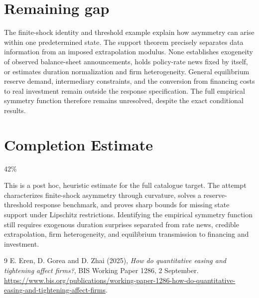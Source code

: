 \documentclass[11pt]{article}
\theoremstyle{definition}
\begin{document}
\section*{Remaining gap}
The finite-shock identity and threshold example explain how asymmetry can arise within one predetermined state. The support theorem precisely separates data information from an imposed extrapolation modulus. None establishes exogeneity of observed balance-sheet announcements, holds policy-rate news fixed by itself, or estimates duration normalization and firm heterogeneity. General equilibrium reserve demand, intermediary constraints, and the conversion from financing costs to real investment remain outside the response specification. The full empirical symmetry function therefore remains unresolved, despite the exact conditional results.

\section{Completion Estimate}
42\%

This is a post hoc, heuristic estimate for the full catalogue target.
The attempt characterizes finite-shock asymmetry through curvature, solves a reserve-threshold response benchmark, and proves sharp bounds for missing state support under Lipschitz restrictions. Identifying the empirical symmetry function still requires exogenous duration surprises separated from rate news, credible extrapolation, firm heterogeneity, and equilibrium transmission to financing and investment.

\begin{thebibliography}{9}
 E. Eren, D. Gorea and D. Zhai (2025), \emph{How do quantitative easing and tightening affect firms?}, BIS Working Paper 1286, 2 September. \url{https://www.bis.org/publications/working-paper-1286-how-do-quantitative-easing-and-tightening-affect-firms}.
\end{thebibliography}
\end{document}
